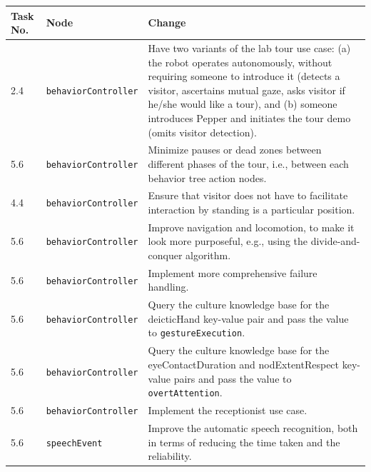 \documentclass{CSSRforAfrica}
\begin{document}
\begin{center}
\begin{table}[H]
\begin{tabularx}{\linewidth}{| l | l | X |}
\hline 
{\small Task No.}                               & {\small Node }                                                 &  {\small Change}       \\
\hline
{\footnotesize 2.4 }  & {\footnotesize \verb+behaviorController+}     & {\footnotesize Have two variants of the lab tour use case: (a) the robot operates autonomously, without requiring someone to introduce it (detects a visitor, ascertains mutual gaze, asks visitor if he/she would like a tour), and (b) someone introduces Pepper and initiates the tour demo (omits visitor detection).} \\ 
\hline
{\footnotesize 5.6 }  & {\footnotesize \verb+behaviorController+}     & {\footnotesize Minimize pauses or dead zones between different phases of the tour, i.e., between each behavior tree action nodes.   } \\ 
\hline
{\footnotesize 4.4 }  & {\footnotesize \verb+behaviorController+}     & {\footnotesize  Ensure that visitor does not have to facilitate interaction by standing is a particular position.} \\ 
\hline
{\footnotesize 5.6 }  & {\footnotesize \verb+behaviorController+}     & {\footnotesize  Improve navigation and locomotion, to make it look more purposeful, e.g., using  the divide-and-conquer algorithm.} \\ 
\hline
{\footnotesize 5.6 }  & {\footnotesize \verb+behaviorController+}     & {\footnotesize  Implement more comprehensive failure handling.} \\ 
\hline
{\footnotesize 5.6 }  & {\footnotesize \verb+behaviorController+}     & {\footnotesize  Query the culture knowledge base for the deicticHand key-value pair and pass the value to \verb+gestureExecution+.} \\ 
\hline
{\footnotesize 5.6 }  & {\footnotesize \verb+behaviorController+}     & {\footnotesize  Query the culture knowledge base for the eyeContactDuration  and nodExtentRespect key-value pairs and pass the value to \verb+overtAttention+.} \\ 
\hline
{\footnotesize 5.6 }  & {\footnotesize \verb+behaviorController+}     & {\footnotesize  Implement the receptionist use case.}\\ 
\hline
{\footnotesize 5.6 }  & {\footnotesize \verb+speechEvent+}     & {\footnotesize  Improve the automatic speech recognition, both in terms of reducing the time taken and the reliability.} \\ 

\end{tabularx}
\end{table}
\end{center}
\end{document}
